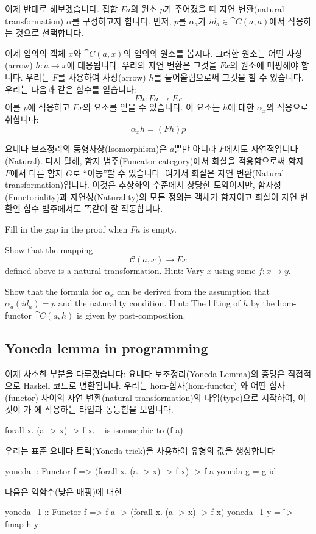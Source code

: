 \documentclass[DaoFP]{subfiles}
\begin{document}
이제 반대로 해보겠습니다. 집합 $F a$의 원소 $p$가 주어졌을 때 자연 변환(natural transformation) $\alpha$를 구성하고자 합니다. 먼저, $p$를 $\alpha_a$가 $id_a \in \cat C(a, a)$에서 작용하는 것으로 선택합니다.

이제 임의의 객체 $x$와 $\cat C(a, x)$의 임의의 원소를 봅시다. 그러한 원소는 어떤 사상(arrow) $h \colon a \to x$에 대응됩니다. 우리의 자연 변환은 그것을 $F x$의 원소에 매핑해야 합니다. 우리는 $F$를 사용하여 사상(arrow) $h$를 들어올림으로써 그것을 할 수 있습니다. 우리는 다음과 같은 함수를 얻습니다:
\[F h \colon F a \to F x \]
이를 $p$에 적용하고 $F x$의 요소를 얻을 수 있습니다. 이 요소는 $h$에 대한 $\alpha_x$의 작용으로 취합니다:
\[ \alpha_x h = (F h) p \]

요네다 보조정리의 동형사상(Isomorphism)은 $a$뿐만 아니라 $F$에서도 자연적입니다(Natural). 다시 말해, 함자 범주(Funcator category)에서 화살을 적용함으로써 함자 $F$에서 다른 함자 $G$로 ``이동''할 수 있습니다. 여기서 화살은 자연 변환(Natural transformation)입니다. 이것은 추상화의 수준에서 상당한 도약이지만, 함자성(Functoriality)과 자연성(Naturality)의 모든 정의는 객체가 함자이고 화살이 자연 변환인 함수 범주에서도 똑같이 잘 작동합니다.

\begin{exercise}
Fill in the gap in the proof when $F a$ is empty.
\end{exercise}
\begin{exercise}
Show that the mapping 
\[ \mathcal{C}(a, x) \to F x\]
defined above is a natural transformation. Hint: Vary $x$ using some $f \colon x \to y$.
\end{exercise}
\begin{exercise}
Show that the formula for $\alpha_x$ can be derived from the assumption that $\alpha_a (id_a) = p$ and the naturality condition. Hint: The lifting of $h$ by the hom-functor $\cat C(a, h)$ is given by post-composition.
\end{exercise}

\subsection{Yoneda lemma in programming}

이제 사소한 부분을 다루겠습니다: 요네다 보조정리(Yoneda Lemma)의 증명은 직접적으로 Haskell 코드로 변환됩니다. 우리는 hom-함자(hom-functor) 와 어떤 함자(functor)  사이의 자연 변환(natural transformation)의 타입(type)으로 시작하여, 이것이 가 에 작용하는 타입과 동등함을 보입니다.
\begin{haskell}
forall x. (a -> x) -> f x.   -- is isomorphic to (f a)
\end{haskell}
우리는 표준 요네다 트릭(Yoneda trick)을 사용하여  유형의 값을 생성합니다
\begin{haskell}
yoneda :: Functor f => (forall x. (a -> x) -> f x) -> f a
yoneda g = g id
\end{haskell}
다음은 역함수(낮은 매핑)에 대한 
\begin{haskell}
yoneda_1 :: Functor f => f a -> (forall x. (a -> x) -> f x)
yoneda_1 y = \h -> fmap h y
\end{haskell}
\end{document}
